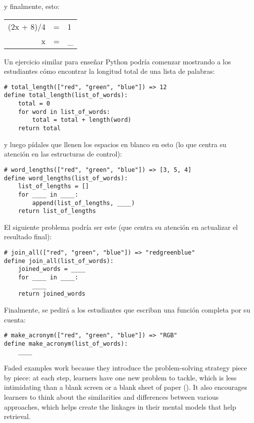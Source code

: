 \noindent
y finalmente, esto:

\begin{center}
\begin{tabular}{rcl}
  (2x + 8)/4	& = &	1	\\
   x		& = &	\_
\end{tabular}
\end{center}

Un ejercicio similar para enseñar Python podría comenzar mostrando a los estudiantes 
cómo encontrar la longitud total de una lista de palabras:

\begin{verbatim}
# total_length(["red", "green", "blue"]) => 12
define total_length(list_of_words):
    total = 0
    for word in list_of_words:
        total = total + length(word)
    return total
\end{verbatim}

\noindent

y luego pídales que llenen los espacios en blanco en esto 
(lo que centra su atención en las estructuras de control):


\begin{verbatim}
# word_lengths(["red", "green", "blue"]) => [3, 5, 4]
define word_lengths(list_of_words):
    list_of_lengths = []
    for ____ in ____:
        append(list_of_lengths, ____)
    return list_of_lengths
\end{verbatim}

El siguiente problema podría ser este 
(que centra su atención en actualizar el resultado final):

\begin{verbatim}
# join_all(["red", "green", "blue"]) => "redgreenblue"
define join_all(list_of_words):
    joined_words = ____
    for ____ in ____:
        ____
    return joined_words
\end{verbatim}

Finalmente, se pedirá a los estudiantes que escriban una función completa por su cuenta:

\begin{verbatim}
# make_acronym(["red", "green", "blue"]) => "RGB"
define make_acronym(list_of_words):
    ____
\end{verbatim}

Faded examples work because
they introduce the problem-solving strategy piece by piece:
at each step,
learners have one new problem to tackle,
which is less intimidating than a blank screen or a blank sheet of paper ().
It also encourages learners to think about the similarities and differences between various approaches,
which helps create the linkages in their mental models that help retrieval.

